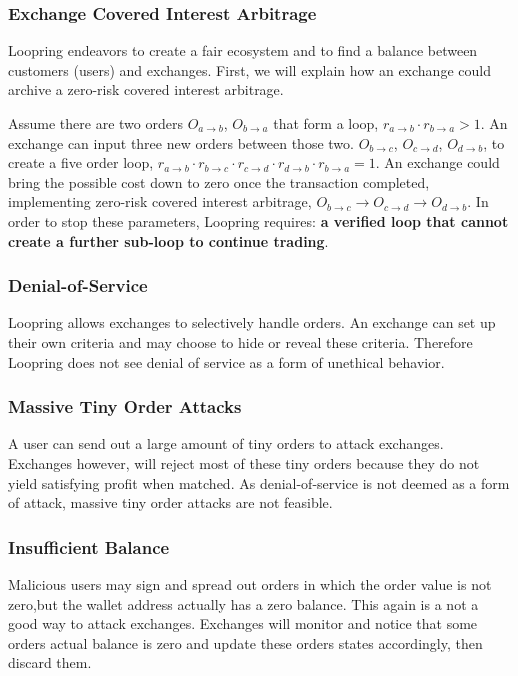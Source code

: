 \documentclass[UTF8,nofonts]{article}
\begin{document}
\subsubsection{Exchange Covered Interest Arbitrage}

Loopring endeavors to create a fair ecosystem and to find a balance between customers (users) and exchanges. First, we will explain how an exchange could archive a zero-risk covered interest arbitrage.

Assume there are two orders $O_{a\rightarrow b}$, $O_{b\rightarrow a}$ that form a loop, $r_{a\rightarrow b} \cdot r_{b\rightarrow a} > 1$. An exchange can input three new orders between those two. $O_{b\rightarrow c}$, $O_{c\rightarrow d}$, $O_{d\rightarrow b}$, to create a five order loop,  $r_{a\rightarrow b} \cdot r_{b\rightarrow c} \cdot r_{c\rightarrow d}\cdot r_{d\rightarrow b}\cdot r_{b\rightarrow a} = 1$. An exchange could bring the possible cost down to zero once the transaction completed, implementing zero-risk covered interest arbitrage, $O_{b\rightarrow c}\rightarrow O_{c\rightarrow d}\rightarrow O_{d\rightarrow b}$. In order to stop these parameters, Loopring requires: {\bfseries a verified loop that cannot create a further sub-loop to continue trading}.

\subsubsection{Denial-of-Service}

Loopring allows exchanges to selectively handle orders. An exchange can set up their own criteria and may choose to hide or reveal these criteria. Therefore Loopring does not see denial of service as a form of unethical behavior.

\subsubsection{Massive Tiny Order Attacks}
A user can send out a large amount of tiny orders to attack exchanges. Exchanges however, will reject most of these tiny orders because they do not yield satisfying profit when matched. As denial-of-service is not deemed as a form of attack, massive tiny order attacks are not feasible.

\subsubsection{Insufficient Balance}

Malicious users may sign and spread out orders in which the order value is not zero,but the wallet address actually has a zero balance. This again is a not a good way to attack exchanges. Exchanges will monitor and notice that some orders actual balance is zero and update these orders states accordingly, then discard them.  
\end{document}
